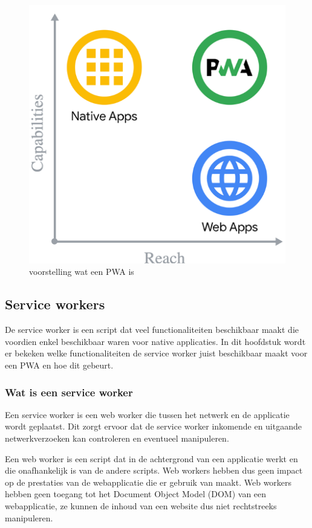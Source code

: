 \begin{figure}[!htb]
	\centering
	\includegraphics{./img/WatIsEenPwa.png}
	\caption{voorstelling wat een PWA is \autocite{Richard2020}}
\end{figure}


\subsection{Service workers}

	De service worker is een script dat veel functionaliteiten beschikbaar maakt die voordien enkel beschikbaar waren voor native applicaties. In dit hoofdstuk wordt er bekeken welke functionaliteiten de service worker juist beschikbaar maakt voor een PWA en hoe dit gebeurt. 
	
	
	
	\subsubsection{Wat is een service worker}
	\label{ch: Wat is een servcie worker}
	
		Een service worker is een web worker die tussen het netwerk en de applicatie wordt geplaatst. Dit zorgt ervoor dat de service worker inkomende en uitgaande netwerkverzoeken kan controleren en eventueel manipuleren.
		\autocite{Mozilla2020}
		
		Een web worker is een script dat in de achtergrond van een applicatie werkt en die onafhankelijk is van de andere scripts. Web workers hebben dus geen impact op de prestaties van de webapplicatie die er gebruik van maakt.  Web workers hebben geen toegang tot het Document Object Model (DOM) van een webapplicatie, ze kunnen de inhoud van een website dus niet rechtstreeks manipuleren.
		\autocite{Verdu2015}
		\autocite{Hiltunen2018}
		
